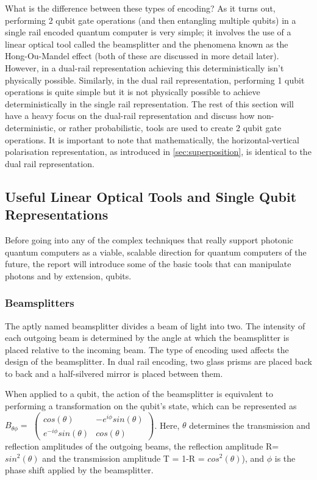 What is the difference between these types of encoding? As it turns out, performing 2 qubit gate operations (and then entangling multiple qubits) in a single rail encoded quantum computer is very simple; it involves the use of a linear optical tool called the beamsplitter and the phenomena known as the Hong-Ou-Mandel effect (both of these are discussed in more detail later). However, in a dual-rail representation achieving this deterministically isn't physically possible. Similarly, in the dual rail representation, performing 1 qubit operations is quite simple but it is not physically possible to achieve deterministically in the single rail representation. The rest of this section will have a heavy focus on the dual-rail representation and discuss how non-deterministic, or rather probabilistic, tools are used to create 2 qubit gate operations. It is important to note that mathematically, the horizontal-vertical polarisation representation, as introduced in \cref{sec:superposition}, is identical to the dual rail representation. 



\subsection{Useful Linear Optical Tools and Single Qubit Representations}
Before going into any of the complex techniques that really support photonic quantum computers as a viable, scalable direction for quantum computers of the future, the report will introduce some of the basic tools that can manipulate photons and by extension, qubits.
\subsubsection{Beamsplitters}

The aptly named beamsplitter divides a beam of light into two. The intensity of each outgoing beam is determined by the angle at which the beamsplitter is placed relative to the incoming beam. The type of encoding used affects the design of the beamsplitter. In dual rail encoding, two glass prisms are placed back to back and a half-silvered mirror is placed between them. %

When applied to a qubit, the action of the beamsplitter is equivalent to performing a transformation on the qubit's state, which can be represented as $B_{\theta\phi} = $ $\begin{pmatrix}
cos(\theta) & -e^{i\phi}sin(\theta) \\
e^{-i\phi}sin(\theta) & cos(\theta) 
\end{pmatrix}$. Here, $\theta$ determines the transmission and reflection amplitudes of the outgoing beams, the reflection amplitude R= $sin^2(\theta)$ and the transmission amplitude T = 1-R = $cos^2(\theta)$), and $\phi$ is the phase shift applied by the beamsplitter.

